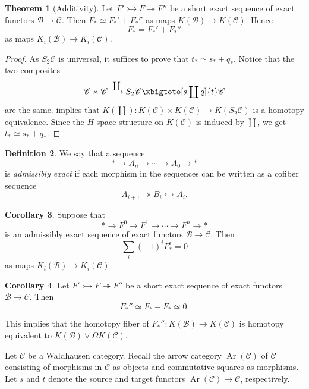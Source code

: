 \documentclass[10pt,letterpaper,cm]{nupset}
\theoremstyle{definition}
\newtheorem{definition}{Definition}[section]
\theoremstyle{theorem}
\newtheorem{theorem}[definition]{Theorem}
\newtheorem{corollary}[definition]{Corollary}
\theoremstyle{remark}
\newcommand{\1}{\mathbf{1}}
\renewcommand{\b}{\mathscr{B}}
\renewcommand{\c}{\mathscr{C}}
\newcommand{\0}{\vec 0}
\DeclareMathOperator{\Ar}{Ar}
\begin{document}
\begin{theorem}[Additivity]\label{add}
Let $F' \rightarrowtail F \twoheadrightarrow F''$ be a short exact sequence of exact functors $\b \to \c$. Then $F_{\ast} \simeq F_{\ast}' + F_{\ast}''$ as maps $K(\b) \to K(\c)$. Hence $$F_{\ast} = F_{\ast}' + F_{\ast}''$$ as maps $K_i(\b) \to K_i(\c)$. 
\end{theorem}
\begin{proof}
As $S_2{\c}$ is universal, it suffices to prove that $t_{\ast}  \simeq s_{\ast} + q_{\ast}$. Notice that the two composites $$\c \times \c \overset{\coprod}{\longrightarrow} S_2{\c} \xbigtoto[s \coprod q]{t} \c$$ are the same.  implies that $K(\coprod): K(\c) \times K(\c) \to K(S_2{\c})$ is a homotopy equivalence. Since the $H$-space structure on $K(\c)$ is induced by $\coprod$, we get $t_{\ast}  \simeq s_{\ast} + q_{\ast}$. 
\end{proof}

\begin{definition}
 We say that a sequence $$\ast \to A_n \to \cdots \to A_0 \to \ast$$ is \textit{admissibly exact} if each morphism in the sequences can be written as a cofiber sequence $$A_{i+1} \twoheadrightarrow B_i \rightarrowtail A_i.$$
\end{definition}

\begin{corollary}
Suppose that $$\ast \to F^0 \to F^1 \to \cdots \to F^n \to \ast$$ is an admissibly exact sequence of exact functors $\b \to \c$. Then $$\sum_i ({-1})^iF_{\ast}^i = 0$$ as maps $K_i(\b) \to K_i(\c)$.
\end{corollary}

\begin{corollary}
Let $F' \rightarrowtail F \twoheadrightarrow F''$ be a short exact sequence of exact functors $\b \to \c$. Then $$F_{\ast}'' \simeq F_{\ast} - F_{\ast} \simeq 0.$$ 
\end{corollary}

This implies that the homotopy fiber of $F_{\ast}'' : K(\b) \to K(\c)$ is homotopy equivalent to $K(\b) \vee \Omega K(\c)$.

\bigskip

Let $\c$ be a Waldhausen category. Recall the arrow category $\Ar(\c)$ of $\c$ consisting of morphisms in $\c$ as objects and commutative squares as morphisms. Let $s$ and $t$ denote the source and target functors $\Ar(\c)\to \c$, respectively. 
\end{document}
